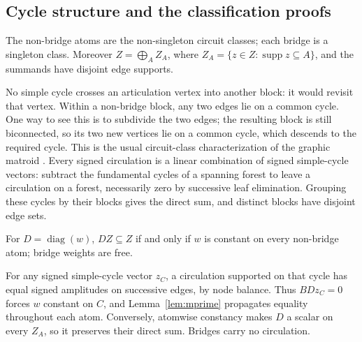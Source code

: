 \subsection{Cycle structure and the classification proofs}\label{app:classificationproof}
\begin{lemma}\label{lem:mprime}
The non-bridge atoms are the non-singleton circuit classes; each bridge
is a singleton class. Moreover $Z=\bigoplus_A Z_A$, where
$Z_A=\{z\in Z:\operatorname{supp}z\subseteq A\}$, and the summands
have disjoint edge supports.
\end{lemma}
\begin{pf}
No simple cycle crosses an articulation vertex into another block: it
would revisit that vertex. Within a non-bridge block, any two edges lie
on a common cycle. One way to see this is to subdivide the two edges;
the resulting block is still biconnected, so its two new vertices lie
on a common cycle, which descends to the required cycle. This is the
usual circuit-class characterization of the graphic matroid
\citep{oxley2011matroid}. Every signed circulation is a linear combination
of signed simple-cycle vectors: subtract the fundamental cycles of a
spanning forest to leave a circulation on a forest, necessarily zero
by successive leaf elimination. Grouping these cycles by their blocks
gives the direct sum, and distinct blocks have disjoint edge sets.
\end{pf}

\begin{lemma}\label{lem:m}
For $D=\operatorname{diag}(w)$, $DZ\subseteq Z$ if and only if $w$ is
constant on every non-bridge atom; bridge weights are free.
\end{lemma}
\begin{pf}
For any signed simple-cycle vector $z_C$, a circulation supported on
that cycle has equal signed amplitudes on successive edges, by node
balance. Thus $BDz_C=0$ forces $w$ constant on $C$, and
Lemma~\ref{lem:mprime} propagates equality throughout each atom.
Conversely, atomwise constancy makes $D$ a scalar on every $Z_A$, so
it preserves their direct sum. Bridges carry no circulation.
\end{pf}

